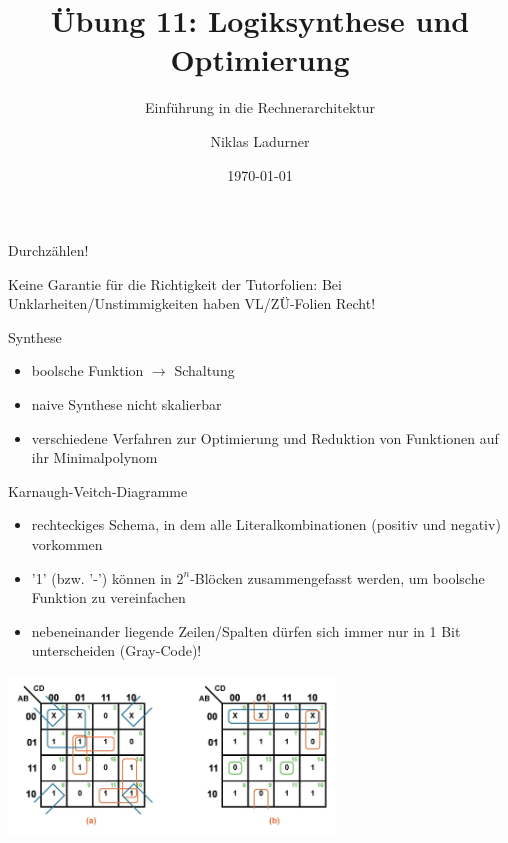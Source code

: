 \documentclass[
  german,            %
  aspectratio=169,    %
]{tumbeamer}
\title{Übung 11: Logiksynthese und\\Optimierung}
\subtitle{Einführung in die Rechnerarchitektur}
\author{Niklas Ladurner}
\institute{\theChairName\\\theDepartmentName\\\theUniversityName}
\date[\today]{\today}
\begin{document}
\maketitle

\begin{frame}[c]{}{}
  \begin{center}
    \LARGE  Durchzählen!
  \end{center}
\end{frame}

\begin{frame}[c]{}{}
  \begin{center}
    \LARGE  Keine Garantie für die Richtigkeit der Tutorfolien: Bei Unklarheiten/Unstimmigkeiten
    haben VL/ZÜ-Folien Recht!
  \end{center}
\end{frame}

\begin{frame}[fragile, c]{Synthese}{}
  \begin{itemize}
    \item boolsche Funktion $\rightarrow$ Schaltung
    \item naive Synthese nicht skalierbar
    \item verschiedene Verfahren zur Optimierung und Reduktion von Funktionen auf ihr Minimalpolynom
  \end{itemize}

\end{frame}

\begin{frame}[fragile, c]{Karnaugh-Veitch-Diagramme}{}
  \begin{itemize}
    \item rechteckiges Schema, in dem alle Literalkombinationen (positiv und negativ) vorkommen
    \item '1' (bzw. '-') können in $2^n$-Blöcken zusammengefasst werden, um boolsche Funktion zu vereinfachen
    \item nebeneinander liegende Zeilen/Spalten dürfen sich immer nur in 1 Bit unterscheiden (Gray-Code)!
  \end{itemize}
  \begin{center}
    \includegraphics[width=0.65\textwidth]{w11_kmap.png}
  \end{center}
\end{frame}
\end{document}
